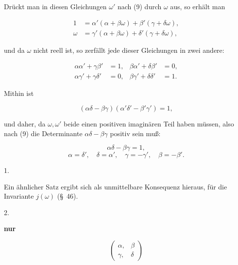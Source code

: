 Dr\"uckt man in diesen Gleichungen $\omega'$ nach (9) durch $\omega$ aus, so erh\"alt man

\[
\begin{aligned}
1 &= \alpha'(\alpha+\beta\omega) + \beta'(\gamma+\delta\omega),\\
\omega &= \gamma'(\alpha+\beta\omega) + \delta'(\gamma+\delta\omega),
\end{aligned}
\]

und da $\omega$ nicht reell ist, so zerf\"allt jede dieser Gleichungen in zwei andere:

\[
\begin{aligned}
\alpha\alpha' + \gamma\beta' &= 1, & \beta\alpha' + \delta\beta' &= 0,\\
\alpha\gamma' + \gamma\delta' &= 0, & \beta\gamma' + \delta\delta' &= 1.
\end{aligned}
\]

Mithin ist

\[
(\alpha\delta - \beta\gamma)(\alpha'\delta' - \beta'\gamma') = 1,
\]

und daher, da $\omega,\omega'$ beide einen positiven imagin\"aren Teil haben m\"ussen, also nach (9) die Determinante $\alpha\delta-\beta\gamma$ positiv sein mu\ss{}:

\[
\alpha\delta - \beta\gamma = 1,
\]
\[
\alpha = \delta', \quad \delta = \alpha', \quad \gamma = -\gamma', \quad \beta = -\beta'.
\]

1. 

Ein \"ahnlicher Satz ergibt sich als unmittelbare Konsequenz hieraus, f\"ur die Invariante $j(\omega)$ (\S\ 46).

2. 


 \textbf{nur} 

\[
\begin{pmatrix} \alpha, & \beta \\ \gamma, & \delta \end{pmatrix}
\]


